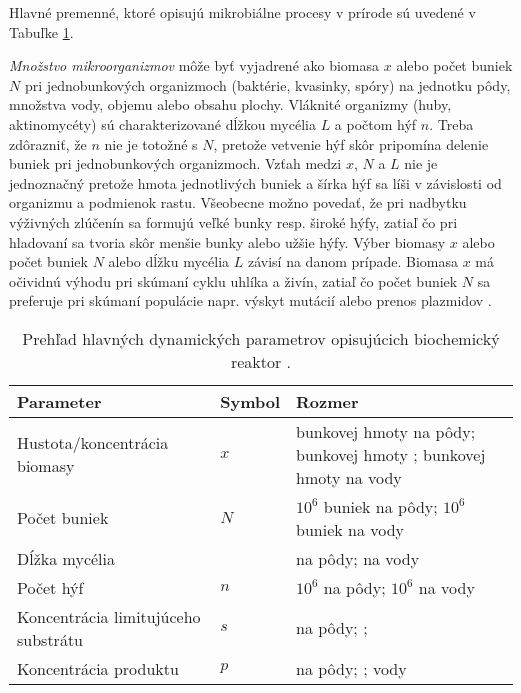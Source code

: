 Hlavné premenné, ktoré opisujú mikrobiálne procesy v prírode sú uvedené v Tabuľke \ref{tab: 1}.

\textit{Množstvo mikroorganizmov} môže byť vyjadrené ako biomasa $x$ alebo počet buniek $N$ pri jednobunkových organizmoch (baktérie, kvasinky, spóry) na jednotku pôdy, množstva vody, objemu alebo obsahu plochy. Vláknité organizmy (huby, aktinomycéty) sú charakterizované dĺžkou mycélia $L$ a počtom hýf $n$. Treba zdôrazniť, že $n$ nie je totožné s $N$, pretože vetvenie hýf skôr pripomína delenie buniek pri jednobunkových organizmoch. Vzťah medzi $x$, $N$ a $L$ nie je jednoznačný pretože hmota jednotlivých buniek a šírka hýf sa líši v závislosti od organizmu a podmienok rastu. Všeobecne možno povedať, že pri nadbytku výživných zlúčenín sa formujú veľké bunky resp. široké hýfy, zatiaľ čo pri hladovaní sa tvoria skôr menšie bunky alebo užšie hýfy. Výber biomasy $x$ alebo počet buniek $N$ alebo dĺžku mycélia $L$ závisí na danom prípade. Biomasa $x$ má očividnú výhodu pri skúmaní cyklu uhlíka a živín, zatiaľ čo počet buniek $N$ sa preferuje pri skúmaní populácie napr. výskyt mutácií alebo prenos plazmidov \cite{ref2}.

\begin{table}
	\centering
	\caption{Prehľad hlavných dynamických parametrov opisujúcich biochemický reaktor \cite{ref2}.}
	\label{tab: 1}
	\begin{tabular}{p{5cm} p{1.9cm} p{4cm}}
		\hline
		\textbf{Parameter} & \textbf{Symbol} & \textbf{Rozmer} \\ 
		\hline
		Hustota/koncentrácia biomasy & $x$ & \micg bunkovej hmoty na \gram pôdy; \gram bunkovej hmoty \unitfrac{1}{\squaremeter}; \micg bunkovej hmoty na \ml vody\\
		Počet buniek & $N$ & $10^{6}$ buniek na \gram pôdy; $10^{6}$ buniek na \ml vody\\
		Dĺžka mycélia & \liter & \meter na \gram pôdy; \meter na \ml vody\\
		Počet hýf & $n$ & $10^{6}$ na \gram pôdy; $10^{6}$ na \ml vody\\
		Koncentrácia limitujúceho substrátu & $s$ & \milligram na \gram pôdy; \unitfrac{\gram}{\squaremeter};\unitfrac{\gram}{\liter vody}\\
		Koncentrácia produktu & $p$ & \milligram na \gram pôdy; \unitfrac{\gram}{\squaremeter}; \unitfrac{\gram}{\liter} vody\\
		\hline	
	\end{tabular}
\end{table}

